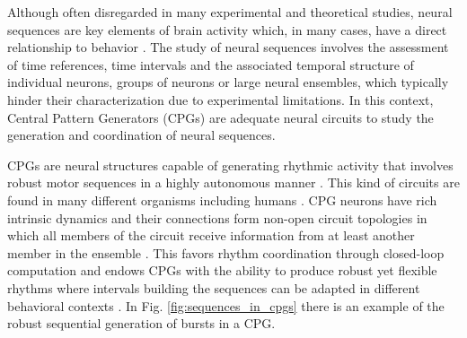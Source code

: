 Although often disregarded in many experimental and theoretical studies, neural sequences are key elements of brain activity which, in many cases, have a direct relationship to behavior \parencite{hahnloser_ultrasparse_2002,venaille_synchronization_2005,buzsaki_space_2018,rabinovich_discrete_2018,paton_neural_2018,elices_robust_2019}.
The study of neural sequences involves the assessment of time references, time intervals and the associated temporal structure of individual neurons, groups of neurons or large neural ensembles, which typically hinder their characterization due to experimental limitations. In this context, Central Pattern Generators (CPGs) are adequate neural circuits to study the generation and coordination of neural sequences. 

CPGs are neural structures capable of generating rhythmic activity that involves robust motor sequences in a highly autonomous manner \parencite{hartline_mottor_1976,selverston_reliable_2000,marder_central_2001}. This kind of circuits are found in many different organisms including humans \parencite{dimitrijevic_evidence_1998,pavlidis_neonatal_2016, arichi_localization_2017}. CPG neurons have rich intrinsic dynamics and their connections form non-open circuit topologies in which all members of the circuit receive information from at least another member in the ensemble \parencite{selverston_reliable_2000,huerta_topology_2001}. This favors rhythm coordination through closed-loop computation and endows CPGs with the ability to produce robust yet flexible rhythms where intervals building the sequences can be adapted in different behavioral contexts \parencite{elices_robust_2019}. %
In Fig. \ref{fig:sequences_in_cpgs} there is an example of the robust sequential generation of bursts in a CPG. 


